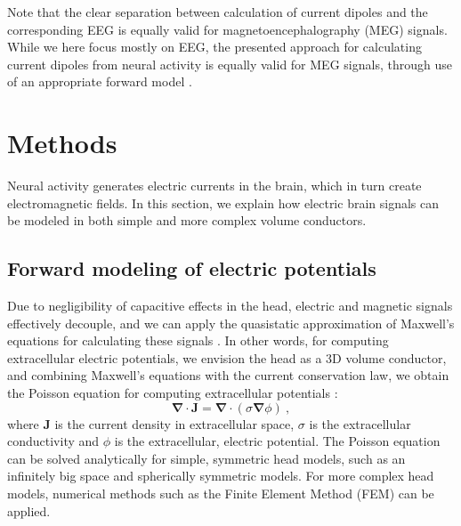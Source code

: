 \documentclass[preprint,10pt,authoryear]{elsarticle}
\newcommand{\hlp}[2][Purple]{ {\sethlcolor{#1} \hl{#2}} }
\newcommand{\gen}[1]{\color{white}{\hlp{GTE: #1 }}\color{black}}
\begin{document}
Note that the clear separation between calculation of current dipoles and the corresponding EEG is equally valid for magnetoencephalography (MEG) signals. While we here focus mostly on EEG, the presented approach for calculating current dipoles from neural activity is equally valid for MEG signals, through use of an appropriate forward model \citep{Ilmoniemi2019}.



\section{Methods}\label{sec:methods}
Neural activity generates electric currents in the brain, which in turn create electromagnetic fields. In this section, we explain how electric brain signals can be modeled in both simple and more complex volume conductors.

\subsection{Forward modeling of electric potentials}
Due to negligibility of capacitive effects in the head, electric and magnetic signals effectively decouple, and we can apply the quasistatic approximation of Maxwell's equations for calculating these signals \citep{HAMALAINEN1993,NUNEZ2006}. In other words, for computing extracellular electric potentials, we envision the head as a 3D volume conductor, and combining Maxwell's equations with the current conservation law, we obtain the Poisson equation for computing extracellular potentials \cite{GRIFFITHS1999}:
\begin{equation} \label{eq:poisson}
\mathbf{\nabla} \cdot \mathbf{J} = \mathbf{\nabla}  \cdot (\sigma \mathbf{\nabla} \phi)~,
\end{equation}
where $\mathbf{J}$ is the current density in extracellular space, $\sigma$ is the extracellular conductivity and $\phi$ is the extracellular, electric potential.
The Poisson equation can be solved analytically for simple, symmetric head models, such as an infinitely big space and spherically symmetric models. For more complex head models, numerical methods such as the Finite Element Method (FEM) can be applied.
\end{document}
